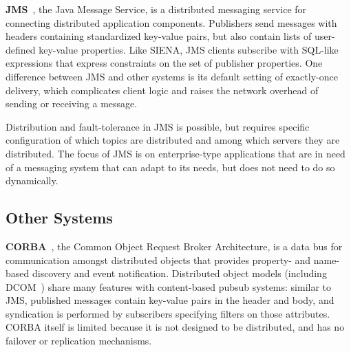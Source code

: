 \textbf{JMS}~\cite{hapner2002java}, the Java Message Service, is a distributed messaging service for connecting distributed application components.
Publishers send messages with headers containing standardized key-value pairs, but also contain lists of user-defined key-value properties.
Like SIENA, JMS clients subscribe with SQL-like expressions that express constraints on the set of publisher properties.
One difference between JMS and other systems is its default setting of exactly-once delivery, which complicates client logic and raises the network overhead of sending or receiving a message.

Distribution and fault-tolerance in JMS is possible, but requires specific configuration of which topics are distributed and among which servers they are distributed.
The focus of JMS is on enterprise-type applications that are in need of a messaging system that can adapt to its needs, but does not need to do so dynamically.


\subsection{Other Systems}

\textbf{CORBA}~\cite{vinoski1997corba}, the Common Object Request Broker Architecture, is a data bus for communication amongst distributed objects that provides property- and name-based discovery and event notification.
Distributed object models (including DCOM~\cite{horstmann1997dcom}) share many features with content-based pubsub systems: similar to JMS, published messages contain key-value pairs in the header and body, and syndication is performed by subscribers specifying filters on those attributes.
CORBA itself is limited because it is not designed to be distributed, and has no failover or replication mechanisms.

